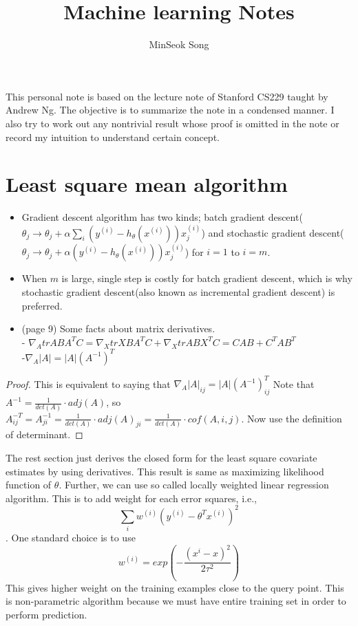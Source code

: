 \documentclass{article}
\title{Machine learning Notes}
\author{MinSeok Song}
\date{}
\theoremstyle{remark}
\begin{document}
\maketitle 
This personal note is based on the lecture note of Stanford CS229 taught by Andrew Ng. The objective is to summarize the note in a condensed manner. I also try to work out any nontrivial result whose proof is omitted in the note or record my intuition to understand certain concept.

\section*{Least square mean algorithm}

\begin{itemize}
    \item Gradient descent algorithm has two kinds; batch gradient descent($\theta_j\rightarrow\theta_j+\alpha \sum_i (y^{(i)}-h_\theta(x^{(i)}))x_j^{(i)}$) and stochastic gradient descent($\theta_j\rightarrow\theta_j+\alpha (y^{(i)}-h_\theta(x^{(i)}))x_j^{(i)}$) for $i=1$ to $i=m$.
    \item When $m$ is large, single step is costly for batch gradient descent, which is why stochastic gradient descent(also known as incremental gradient descent) is preferred.
    \item (page 9) Some facts about matrix derivatives.\\
- $\nabla_A trABA^T C=\nabla_X trXBA^TC+\nabla_X trABX^T C=CAB+C^TAB^T$\\
-$\nabla_A\lvert A\rvert=\lvert A\rvert (A^{-1})^T$
\end{itemize}
\begin{proof}
This is equivalent to saying that $\nabla_A\lvert A\rvert_{ij}=\lvert A\rvert (A^{-1})^T_{ij}$
Note that $A^{-1}=\frac 1{det(A)}\cdot adj(A)$, so $A^{-T}_{ij}=A^{-1}_{ji}=\frac 1{det(A)}\cdot adj(A)_{ji}=\frac 1{det(A)}\cdot cof(A, i, j)$. Now use the definition of determinant.
\end{proof}
The rest section just derives the closed form for the least square covariate estimates by using derivatives. This result is same as maximizing likelihood function of $\theta$. Further, we can use so called locally weighted linear regression algorithm. This is to add weight for each error squares, i.e., $$\sum_i w^{(i)}(y^{(i)}-\theta ^T x^{(i)})^2$$.
One standard choice is to use $$w^{(i)}=exp(-\frac{(x^{i}-x)^2}{2\tau^2})$$
This gives higher weight on the training examples close to the query point. This is non-parametric algorithm because we must have entire training set in order to perform prediction.
\end{document}
